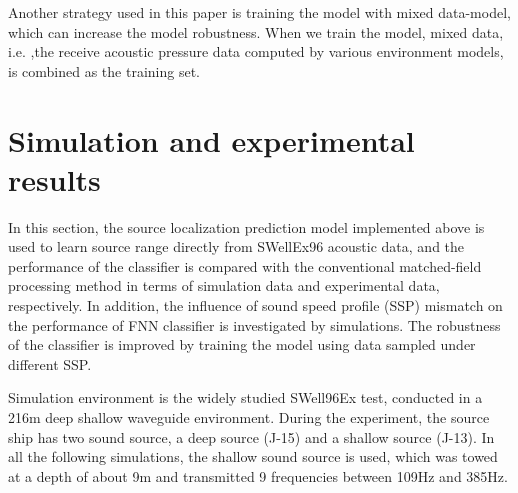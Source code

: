 Another strategy used in this paper is training the model with mixed data-model, which can increase the model robustness.
When we train the model, mixed data, i.e. ,the receive acoustic pressure data computed by various environment models, is combined as the training set.

\section{Simulation and experimental results}
In this section, the source localization prediction model implemented above is used to learn source range directly from SWellEx96 acoustic data, and the performance of the classifier is compared with the conventional matched-field processing method in terms of simulation data and experimental data, respectively. In addition, the influence of sound speed profile (SSP) mismatch on the performance of FNN classifier is investigated by simulations. The robustness of the classifier is improved by training the model using data sampled under different SSP.

Simulation environment is the widely studied SWell96Ex test, conducted in a 216m deep shallow waveguide environment.
During the experiment, the source ship has two sound source, a deep source (J-15) and a shallow source (J-13). In all the following simulations, the shallow sound source is used, which was towed at a depth of about 9m and transmitted 9 frequencies between 109Hz and 385Hz.

